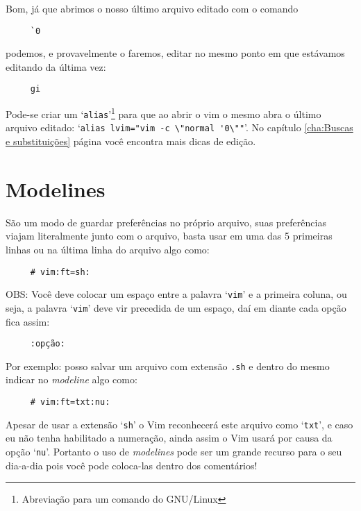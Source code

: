 Bom, já que abrimos o nosso último arquivo editado com o comando

\begin{verbatim}
     `0
\end{verbatim}

podemos, e provavelmente o faremos, editar no mesmo ponto em que estávamos
editando da última vez:

\begin{verbatim}
     gi
\end{verbatim}

{\Large {}} Pode-se criar um `{\tt alias}'\footnote{Abreviação para um
comando do GNU/Linux} para que ao abrir o vim o mesmo abra o último arquivo
editado: `\verb|alias lvim="vim -c \"normal '0\""|'.  No capítulo
\ref{cha:Buscas e substituições} página \pageref{cha:Buscas e substituições}
você encontra mais dicas de edição.


\section{Modelines}\label{sec:Modelines}

São um modo de guardar preferências no próprio arquivo, suas
preferências viajam literalmente junto com o arquivo, basta usar em
uma das 5 primeiras linhas ou na última linha do arquivo algo
como:

\begin{verbatim}
     # vim:ft=sh:
\end{verbatim}

OBS: Você deve colocar um espaço entre a palavra `{\tt vim}' e a primeira
coluna, ou seja, a palavra `{\tt vim}' deve vir precedida de um espaço, daí
em diante cada opção fica assim:

\begin{verbatim}
     :opção:
\end{verbatim}

Por exemplo: posso salvar um arquivo com extensão \verb|.sh| e dentro do
mesmo indicar no {\em modeline} algo como:

\begin{verbatim}
     # vim:ft=txt:nu:
\end{verbatim}

Apesar de usar a extensão `{\tt sh}' o Vim reconhecerá este arquivo como `{\tt txt}', e
caso eu não tenha habilitado a numeração, ainda assim o Vim usará por causa da
opção `{\tt nu}'.  Portanto o uso de {\em modelines} pode ser um grande recurso para o seu
dia-a-dia pois você pode coloca-las dentro dos comentários!

